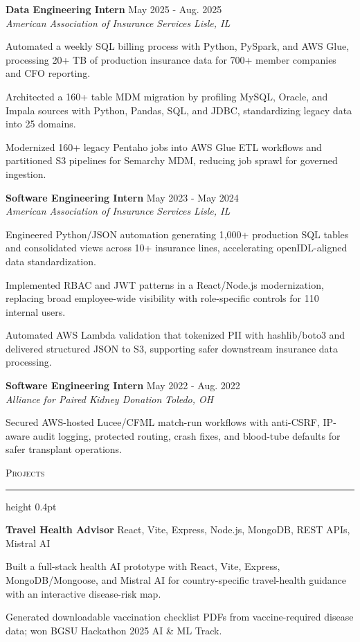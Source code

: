 \documentclass[letterpaper,11pt]{article}
\newcommand{\resumesection}[1]{%
  \par\vspace{2pt}%
  {\large\scshape #1}\par\vspace{2pt}%
  \hrule height 0.4pt\vspace{2pt}%
}
\newcommand{\resumeSubheading}[4]{
  \textbf{#1} \hfill #2\\
  \textit{#3} \hfill \textit{#4}
}
\newcommand{\projectHeading}[2]{
  \textbf{#1} \hfill #2
}
\begin{document}
\resumeSubheading
{Data Engineering Intern}{May 2025 - Aug. 2025}
{American Association of Insurance Services}{Lisle, IL}
\begin{tightitemize}
  \item Automated a weekly SQL billing process with Python, PySpark, and AWS Glue, processing 20+ TB of production insurance data for 700+ member companies and CFO reporting.
  \item Architected a 160+ table MDM migration by profiling MySQL, Oracle, and Impala sources with Python, Pandas, SQL, and JDBC, standardizing legacy data into 25 domains.
  \item Modernized 160+ legacy Pentaho jobs into AWS Glue ETL workflows and partitioned S3 pipelines for Semarchy MDM, reducing job sprawl for governed ingestion.
\end{tightitemize}

\resumeSubheading
{Software Engineering Intern}{May 2023 - May 2024}
{American Association of Insurance Services}{Lisle, IL}
\begin{tightitemize}
  \item Engineered Python/JSON automation generating 1,000+ production SQL tables and consolidated views across 10+ insurance lines, accelerating openIDL-aligned data standardization.
  \item Implemented RBAC and JWT patterns in a React/Node.js modernization, replacing broad employee-wide visibility with role-specific controls for 110 internal users.
  \item Automated AWS Lambda validation that tokenized PII with hashlib/boto3 and delivered structured JSON to S3, supporting safer downstream insurance data processing.
\end{tightitemize}

\resumeSubheading
{Software Engineering Intern}{May 2022 - Aug. 2022}
{Alliance for Paired Kidney Donation}{Toledo, OH}
\begin{tightitemize}
  \item Secured AWS-hosted Lucee/CFML match-run workflows with anti-CSRF, IP-aware audit logging, protected routing, crash fixes, and blood-tube defaults for safer transplant operations.
\end{tightitemize}

\resumesection{Projects}
\projectHeading{Travel Health Advisor}{React, Vite, Express, Node.js, MongoDB, REST APIs, Mistral AI}
\begin{tightitemize}
  \item Built a full-stack health AI prototype with React, Vite, Express, MongoDB/Mongoose, and Mistral AI for country-specific travel-health guidance with an interactive disease-risk map.
  \item Generated downloadable vaccination checklist PDFs from vaccine-required disease data; won BGSU Hackathon 2025 AI \& ML Track.
\end{tightitemize}
\end{document}
